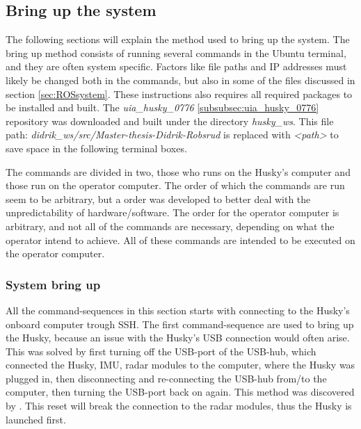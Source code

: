 %

\subsection{Bring up the system}
The following sections will explain the method used to bring up the system. The bring up method consists of running several commands in the Ubuntu terminal, and they are often system specific. Factors like file paths and IP addresses must likely be changed both in the commands, but also in some of the files discussed in section \ref{sec:ROSsystem}. These instructions also requires all required packages to be installed and built. The \textit{uia\_husky\_0776} \ref{subsubsec:uia_husky_0776} repository was downloaded and built under the directory \textit{husky\_ws}. This file path: \textit{didrik\_ws/src/Master-thesis-Didrik-Robsrud} is replaced with \textit{<path>} to save space in the following terminal boxes. 

The commands are divided in two, those who runs on the Husky's computer and those run on the operator computer. The order of which the commands are run seem to be arbitrary, but a order was developed to better deal with the unpredictability of hardware/software. The order for the operator computer is arbitrary, and not all of the commands are necessary, depending on what the operator intend to achieve. All of these commands are intended to be executed on the operator computer.

\subsubsection{System bring up}
All the command-sequences in this section starts with connecting to the Husky's onboard computer trough SSH. The first command-sequence are used to bring up the Husky, because an issue with the Husky's USB connection would often arise. This was solved by first turning off the USB-port of the USB-hub, which connected the Husky, IMU, radar modules to the computer, where the Husky was plugged in, then disconnecting and re-connecting the USB-hub from/to the computer, then turning the USB-port back on again. This method was discovered by \cite{ovsthus2023}. This reset will break the connection to the radar modules, thus the Husky is launched first.

